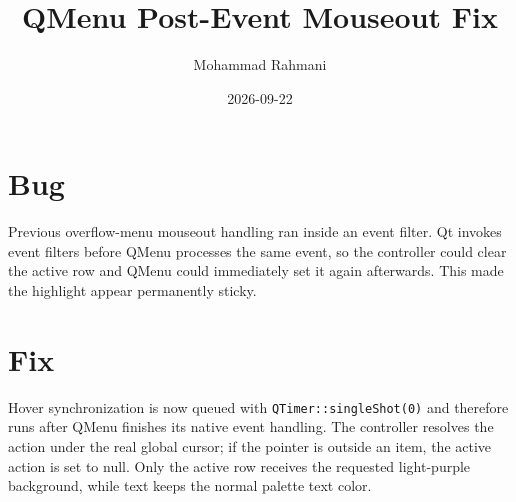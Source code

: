 \documentclass[a4paper]{article}
\title{QMenu Post-Event Mouseout Fix}
\date{2026-09-22}
\author{Mohammad Rahmani}
\begin{document}
   \maketitle

   \begin{preview}
      \section{Bug}
      Previous overflow-menu mouseout handling ran inside an event filter.
      Qt invokes event filters before QMenu processes the same event, so the
      controller could clear the active row and QMenu could immediately set it
      again afterwards.  This made the highlight appear permanently sticky.

      \section{Fix}
      Hover synchronization is now queued with \texttt{QTimer::singleShot(0)}
      and therefore runs after QMenu finishes its native event handling.  The
      controller resolves the action under the real global cursor; if the
      pointer is outside an item, the active action is set to null.  Only the
      active row receives the requested light-purple background, while text
      keeps the normal palette text color.
   \end{preview}

   
   
\end{document}
